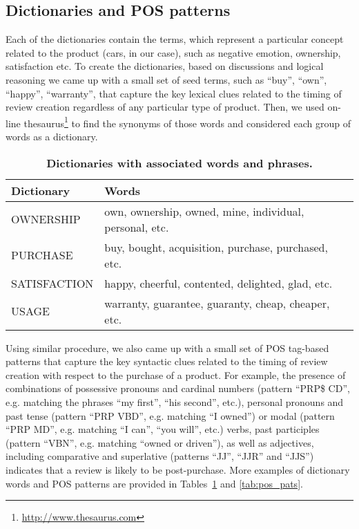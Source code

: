 \documentclass[runningheads,a4paper]{llncs}
\begin{document}
\subsection{Dictionaries and POS patterns}
\label{sec:dict_pos}

Each of the dictionaries contain the terms, which represent a particular concept related to the product (cars, in our case), such as negative emotion, ownership,
satisfaction etc. To create the dictionaries, based on discussions and logical reasoning we came up with a small set of seed terms, such as ``buy'', ``own'', ``happy'',
``warranty'', that capture the key lexical clues related to the timing of review creation regardless of any particular type of product. Then, we used on-line
thesaurus\footnote{\url{http://www.thesaurus.com}} to find the synonyms of those words and considered each group of words as a dictionary.

\begin{table}[!h]
\caption{\label{tab:dicts}\textbf{Dictionaries with associated words and phrases.}}
\centering
\begin{tabular} { |l|l| }
 \hline\hline
 {\bf Dictionary} & {\bf Words} \\
 \hline
  OWNERSHIP  & own, ownership, owned, mine, individual, personal, etc. \\
  \hline
  PURCHASE & buy, bought, acquisition, purchase, purchased, etc.  \\
  \hline
  SATISFACTION & happy, cheerful, contented, delighted, glad, etc. \\
  \hline
  USAGE & warranty, guarantee, guaranty, cheap, cheaper, etc.  \\
  \hline\hline
\end{tabular}
\end{table}


Using similar procedure, we also came up with a small set of POS tag-based patterns that capture the key syntactic clues related to the timing of review creation with respect to
the purchase of a product. For example, the presence of combinations of possessive pronouns and cardinal numbers (pattern ``PRP\$ CD'', e.g. matching the phrases ``my first'',
``his second'', etc.), personal pronouns and past tense (pattern ``PRP VBD'', e.g. matching ``I owned'') or modal (pattern ``PRP MD'', e.g. matching ``I can'', ``you will'', etc.)
verbs, past participles (pattern ``VBN'', e.g. matching ``owned or driven''), as well as adjectives, including comparative and superlative (patterns ``JJ'', ``JJR'' and ``JJS'')
indicates that a review is likely to be post-purchase. More examples of dictionary words and POS patterns are provided in Tables~\ref{tab:dicts} and \ref{tab:pos_pats}.
\end{document}
